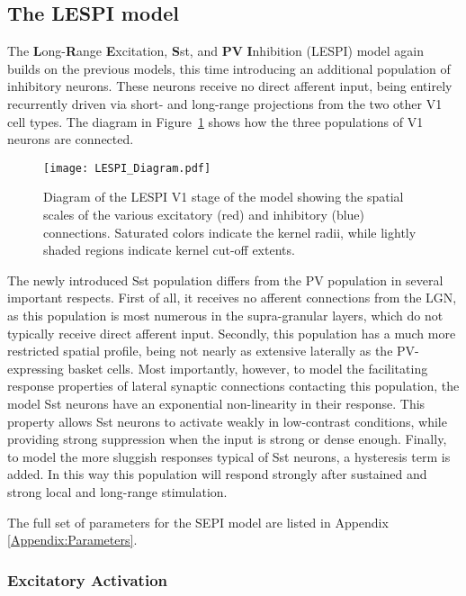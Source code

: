 \subsection{The LESPI model}

The \textbf{L}ong-\textbf{R}ange \textbf{E}xcitation, \textbf{S}st,
and \textbf{PV} \textbf{I}nhibition (LESPI) model again builds on the
previous models, this time introducing an additional population of
inhibitory neurons.  These neurons receive no direct afferent input,
being entirely recurrently driven via short- and long-range
projections from the two other V1 cell types. The diagram in
Figure~\ref{LESPIDiagram} shows how the three populations of V1
neurons are connected.

\begin{figure}
	\centering
        \texttt{[image: LESPI\_Diagram.pdf]}
	\caption{Diagram of the LESPI V1 stage of the model showing the
      spatial scales of the various excitatory (red) and inhibitory
      (blue) connections. Saturated colors indicate the kernel radii,
      while lightly shaded regions indicate kernel cut-off extents.}
	\label{LESPIDiagram}
\end{figure}

The newly introduced Sst population differs from the PV population
in several important respects. First of all, it receives no afferent connections
from the LGN, as this population is most numerous in the
supra-granular layers, which do not typically receive direct afferent
input. Secondly, this population has a much more restricted spatial
profile, being not nearly as extensive laterally as the
PV-expressing basket cells. Most importantly, however, to model the
facilitating response properties of lateral synaptic connections
contacting this population, the model Sst neurons have an exponential
non-linearity in their 
response. This property allows Sst neurons to activate weakly in
low-contrast conditions, while providing strong suppression when the
input is strong or dense enough. Finally, to model the more sluggish
responses typical of Sst neurons, a hysteresis term is added. In this
way this population will respond strongly after sustained and strong local
and long-range stimulation.

The full set of parameters for the SEPI model are listed in Appendix
\ref{Appendix:Parameters}.

\subsubsection{Excitatory Activation}

